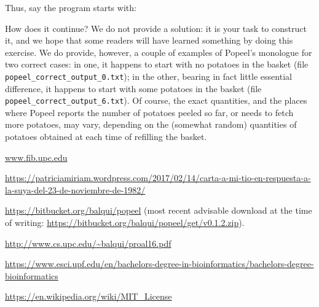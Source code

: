 \documentclass[12pt]{article}
\begin{document}
Thus, say the program starts with:




How does it continue? We do not provide a solution:
it is your task to construct it, and we hope that
some readers will have learned something by doing
this exercise. We do provide, however, a couple of
examples of Popeel's monologue for two correct cases:
in one, it happens to start with no potatoes in the
basket (file {\tt popeel_correct_output_0.txt});
in the other, bearing in fact little essential difference,
it happens to start with some potatoes 
in the
basket (file {\tt popeel_correct_output_6.txt}).
Of course, the exact quantities, and the places where
Popeel reports the number of potatoes peeled so far,
or needs to fetch more potatoes,
may vary, depending on the (somewhat random) 
quantities of potatoes
obtained at each time of refilling the basket.

\begin{thebibliography}{10}

\url{www.fib.upc.edu}

\url{https://patriciamiriam.wordpress.com/2017/02/14/carta-a-mi-tio-en-respuesta-a-la-suya-del-23-de-noviembre-de-1982/}

\url{https://bitbucket.org/balqui/popeel} (most recent advisable download
at the time of writing: \url{https://bitbucket.org/balqui/popeel/get/v0.1.2.zip}).

\url{http://www.cs.upc.edu/~balqui/proal16.pdf}

\url{https://www.esci.upf.edu/en/bachelors-degree-in-bioinformatics/bachelors-degree-bioinformatics}

\url{https://en.wikipedia.org/wiki/MIT_License}

\end{thebibliography}
\end{document}
